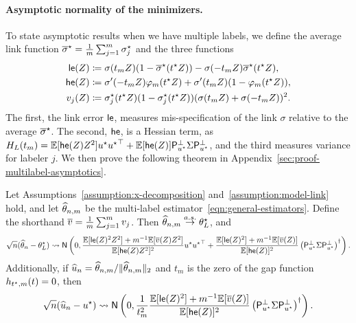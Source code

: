 \paragraph{Asymptotic normality of the minimizers.} 
To state asymptotic results when we have multiple labels,
we define the average link function $\overline{\sigma}^\star = \frac{1}{m} \sum_{j=1}^m \sigma_j^\star$ and the three functions
\begin{align}
	\mathsf{le}(Z) & \coloneqq \sigma(t_m Z) (1 - \overline{\sigma}^\star(t^\star Z))
	- \sigma(-t_m Z) \overline{\sigma}^\star(t^\star Z), \nonumber \\
	\mathsf{he}(Z) & \coloneqq \sigma'(-t_m Z) \varphi_m(t^\star Z)
	+ \sigma'(t_m Z) (1 - \varphi_m(t^\star Z)),
	\label{eqn:error-functions}
	\\
	v_j(Z) & \coloneqq
	\sigma_j^\star(t^\star Z)(1 - \sigma_j^\star(t^\star Z))
	(\sigma(t_m Z) + \sigma(-t_m Z))^2.
	\nonumber
\end{align}
The first, the link error $\mathsf{le}$, measures mis-specification of the
link $\sigma$ relative to the average $\overline{\sigma}^\star$. The second,
$\mathsf{he}$, is a Hessian term, as $H_L(t_m) =
\mathbb{E}[\mathsf{he}(Z) Z^2]u^\star{u^\star}^\top + \mathbb{E}[\mathsf{he}(Z)] \mathsf{P}_{u^\star}^\perp \Sigma
\mathsf{P}_{u^\star}^\perp$, and the third measures variance for labeler $j$.
We then prove the following theorem
in Appendix~\ref{sec:proof-multilabel-asymptotics}.
\begin{theorem}
  \label{theorem:multilabel-asymptotics}
  Let Assumptions~\ref{assumption:x-decomposition}
  and~\ref{assumption:model-link} hold, and let $\widehat{\theta}_{n,m}$ be the multi-label
  estimator~\eqref{eqn:general-estimators}.
  Define the shorthand $\overline{v} =
  \frac{1}{m} \sum_{j = 1}^m v_j$. Then $\widehat{\theta}_{n,m} \stackrel{a.s.}{\rightarrow} \theta_L^\star$,
  and
  \begin{equation*}
    \sqrt{n} (\widehat{\theta}_n - \theta_L^\star)
    \rightsquigarrow \mathsf{N}\left(0,
    \frac{\mathbb{E}[\mathsf{le}(Z)^2 Z^2] + m^{-1} \mathbb{E}[\overline{v}(Z) Z^2]}{
      \mathbb{E}[\mathsf{he}(Z) Z^2]^2} u^\star {u^\star}^\top
    + \frac{\mathbb{E}[\mathsf{le}(Z)^2] + m^{-1}\mathbb{E}[\overline{v}(Z)]}{\mathbb{E}[\mathsf{he}(Z)]^2}
    \left({\mathsf{P}_{u^\star}^\perp \Sigma \mathsf{P}_{u^\star}^\perp}\right)^\dagger
    \right).
  \end{equation*}
  Additionally, if $\widehat{u}_n = \widehat{\theta}_{n,m} / \|{\widehat{\theta}_{n,m}}\|_2$
  and $t_m$ is the zero of the gap function $h_{t^\star, m}(t) = 0$, then
  \begin{equation*}
    \sqrt{n}(\widehat{u}_n - u^\star)
    \rightsquigarrow
    \mathsf{N}\left(0, \frac{1}{t_m^2}
    \frac{\mathbb{E}[\mathsf{le}(Z)^2] + m^{-1}
      \mathbb{E}[\overline{v}(Z)]}{\mathbb{E}[\mathsf{he}(Z)]^2}
    \left(\mathsf{P}_{u^\star}^\perp \Sigma \mathsf{P}_{u^\star}^\perp\right)^\dagger\right).
  \end{equation*}
\end{theorem}


